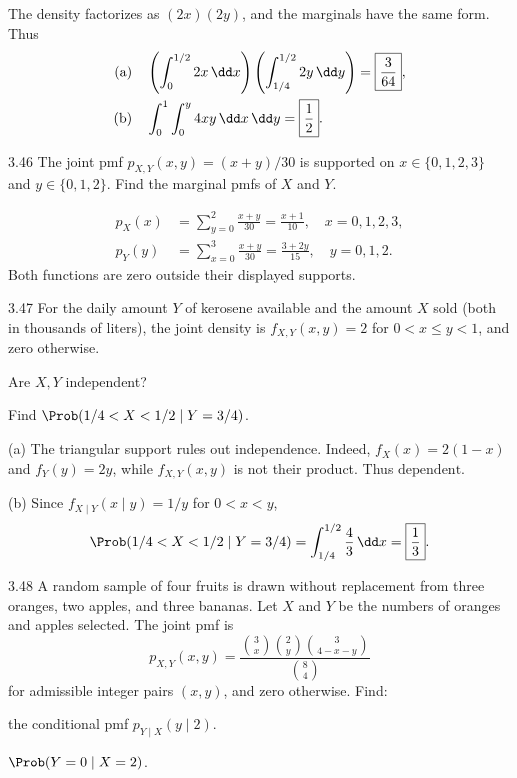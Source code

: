 \documentclass[11pt,oneside]{article}
\begin{document}
\begin{solution}
The density factorizes as $(2x)(2y)$, and the marginals have the same form. Thus
\begin{align*}
\textup{(a)}\quad&\left(\int_0^{1/2}2x\,\dd x\right)
\left(\int_{1/4}^{1/2}2y\,\dd y\right)
=\boxed{\frac3{64}},\\
\textup{(b)}\quad&\int_0^1\int_0^y4xy\,\dd x\,\dd y
=\boxed{\frac12}.
\end{align*}
\end{solution}

\begin{exercise}{3.46}
The joint pmf $p_{X,Y}(x,y)=(x+y)/30$ is supported on $x\in\{0,1,2,3\}$ and $y\in\{0,1,2\}$. Find the marginal pmfs of $X$ and $Y$.
\end{exercise}

\begin{solution}
\begin{align*}
p_X(x)&=\sum_{y=0}^2\frac{x+y}{30}=\boxed{\frac{x+1}{10}},\quad x=0,1,2,3,\\
p_Y(y)&=\sum_{x=0}^3\frac{x+y}{30}=\boxed{\frac{3+2y}{15}},\quad y=0,1,2.
\end{align*}
Both functions are zero outside their displayed supports.
\end{solution}

\begin{exercise}{3.47}
For the daily amount $Y$ of kerosene available and the amount $X$ sold (both in thousands of liters), the joint density is $f_{X,Y}(x,y)=2$ for $0<x\le y<1$, and zero otherwise.
\begin{exercisesubparts}
\item Are $X,Y$ independent?
\item Find $\Prob(1/4<X<1/2\mid Y=3/4)$.
\end{exercisesubparts}
\end{exercise}

\begin{solution}
\textup{(a)} The triangular support rules out independence. Indeed, $f_X(x)=2(1-x)$ and $f_Y(y)=2y$, while $f_{X,Y}(x,y)$ is not their product. Thus $\boxed{\text{dependent}}$.\par\medskip
\noindent\textup{(b)} Since $f_{X\mid Y}(x\mid y)=1/y$ for $0<x<y$,
\[
\Prob(1/4<X<1/2\mid Y=3/4)=\int_{1/4}^{1/2}\frac4{3}\,\dd x=\boxed{\frac13}.
\]
\end{solution}

\begin{exercise}{3.48}
A random sample of four fruits is drawn without replacement from three oranges, two apples, and three bananas. Let $X$ and $Y$ be the numbers of oranges and apples selected. The joint pmf is
\[
p_{X,Y}(x,y)=\frac{\binom{3}{x}\binom{2}{y}\binom{3}{4-x-y}}{\binom{8}{4}}
\]
for admissible integer pairs $(x,y)$, and zero otherwise.
Find:
\begin{exercisesubparts}
\item the conditional pmf $p_{Y\mid X}(y\mid2)$.
\item $\Prob(Y=0\mid X=2)$.
\end{exercisesubparts}
\end{exercise}
\end{document}
